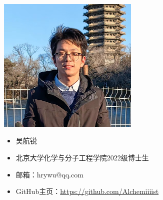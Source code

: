 \begin{figure}[ht]
    \hfill
    \begin{minipage}[c]{0.4\textwidth}
        \includegraphics[width=0.6\textwidth]{./image/author-whr.jpg}
    \end{minipage}
    \hfil
    \begin{minipage}[c]{0.5\textwidth}
        \begin{itemize}
            \item 吴航锐
            \item 北京大学化学与分子工程学院2022级博士生
            \item 邮箱：hrywu@qq.com
            \item GitHub主页：\href{https://github.com/Alchemiiiist}{https://github.com/Alchemiiiist}
        \end{itemize}
    \end{minipage}
\end{figure}

